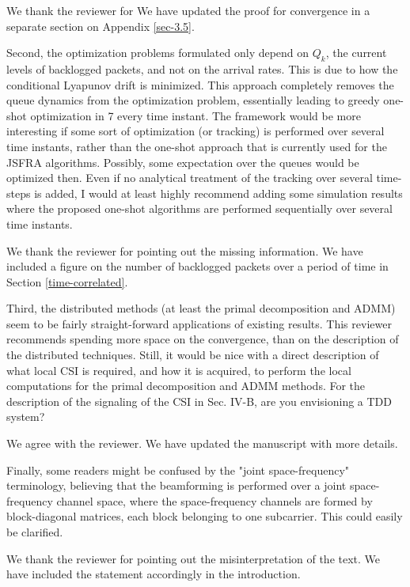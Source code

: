 \resp We thank the reviewer for We have updated the proof for convergence in a separate section on Appendix \ref{sec-3.5}.

 Second, the optimization problems formulated only depend on $Q_k$, the current levels of backlogged packets, and not on the arrival rates. This is due to how the conditional Lyapunov drift is minimized. This approach completely removes the queue dynamics from the optimization problem, essentially leading to greedy one-shot optimization in 7
every time instant. The framework would be more interesting if some sort of optimization (or tracking) is performed over several time instants, rather than the one-shot approach that is currently used for the JSFRA algorithms. Possibly, some expectation over the queues would be optimized then. Even if no analytical treatment of the tracking over several time-steps is added, I would at least highly recommend adding some simulation results where the proposed one-shot algorithms are performed sequentially over several time instants.

\resp We thank the reviewer for pointing out the missing information. We have included a figure on the number of backlogged packets over a period of time in Section \ref{time-correlated}. 

 Third, the distributed methods (at least the primal decomposition and ADMM) seem to be fairly straight-forward applications of existing results. This reviewer recommends spending more space on the convergence, than on the description of the distributed techniques. Still, it would be nice with a direct description of what local CSI is required, and how it is acquired, to perform the local computations for the primal decomposition and ADMM methods. For the description of the signaling of the CSI in Sec. IV-B, are you envisioning a TDD system?

\resp We agree with the reviewer. We have updated the manuscript with more details. 

 Finally, some readers might be confused by the "joint space-frequency" terminology, believing that the beamforming is performed over a joint space-frequency channel space, where the space-frequency channels are formed by block-diagonal matrices, each block belonging to one subcarrier. This could easily be clarified. 

\resp We thank the reviewer for pointing out the misinterpretation of the text. We have included the statement accordingly in the introduction.

